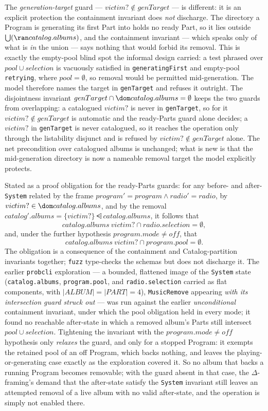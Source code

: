 \documentclass[a4paper,10pt,fleqn]{article}
\begin{document}
The \emph{generation-target} guard --- $victim? \notin genTarget$ --- is
different: it is an explicit protection the containment invariant does
\emph{not} discharge. The directory a Program is generating its first Part into
holds no ready Part, so it lies outside $\bigcup (\ran catalog.albums)$, and the
containment invariant --- which speaks only of what is \emph{in} the union ---
says nothing that would forbid its removal. This is exactly the empty-pool blind
spot the informal design carried: a test phrased over $pool \cup selection$ is
vacuously satisfied in \texttt{generatingFirst} and empty-pool
\texttt{retrying}, where $pool = \emptyset$, so removal would be permitted
mid-generation. The model therefore names the target in \texttt{genTarget} and
refuses it outright. The disjointness invariant
$genTarget \cap \dom catalog.albums = \emptyset$ keeps the two guards from
overlapping: a catalogued $victim?$ is never in \texttt{genTarget}, so for it
$victim? \notin genTarget$ is automatic and the ready-Parts guard alone decides;
a $victim?$ in \texttt{genTarget} is never catalogued, so it reaches the
operation only through the listability disjunct and is refused by
$victim? \notin genTarget$ alone. The net precondition over catalogued albums is
unchanged; what is new is that the mid-generation directory is now a nameable
removal target the model explicitly protects.

Stated as a proof obligation for the ready-Parts guards: for any before- and
after-\texttt{System} related by the frame $program' = program \land radio' =
radio$, by $victim? \in \dom catalog.albums$, and by the removal
$catalog'.albums = \{victim?\} \ndres catalog.albums$, it follows that
\[
  catalog.albums~victim? \cap radio.selection = \emptyset,
\]
and, under the further hypothesis $program.mode \neq off$, that
\[
  catalog.albums~victim? \cap program.pool = \emptyset.
\]
The obligation is a consequence of the containment and Catalog-partition
invariants together; \texttt{fuzz} type-checks the schemas but does not discharge
it. The earlier \texttt{probcli} exploration --- a bounded, flattened image of
the \texttt{System} state (\texttt{catalog.albums}, \texttt{program.pool}, and
\texttt{radio.selection} carried as flat components, with $|ALBUM| = |PART| =
4$), \texttt{MusicRemove} appearing \emph{with its intersection guard struck
out} --- was run against the earlier \emph{unconditional} containment invariant,
under which the pool obligation held in every mode; it found no reachable
after-state in which a removed album's Parts still intersect $pool \cup
selection$. Tightening the invariant with the $program.mode \neq off$ hypothesis
only \emph{relaxes} the guard, and only for a stopped Program: it exempts the
retained pool of an off Program, which backs nothing, and leaves the
playing-or-generating case exactly as the exploration covered it. So no album
that backs a running Program becomes removable; with the guard absent in that
case, the $\Delta$-framing's demand that the after-state satisfy the
\texttt{System} invariant still leaves an attempted removal of a live album with
no valid after-state, and the operation is simply not enabled there.
\end{document}
